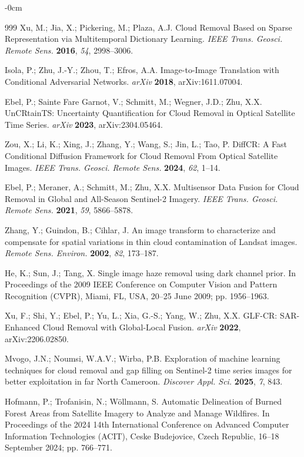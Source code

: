 \documentclass[remotesensing,article,submit,pdftex,moreauthors]{Definitions/mdpi}
\begin{document}
\begin{adjustwidth}{-\extralength}{0cm}
\begin{thebibliography}{999}
Xu, M.; Jia, X.; Pickering, M.; Plaza, A.J. Cloud Removal Based on Sparse Representation via Multitemporal Dictionary Learning. {\em IEEE Trans. Geosci. Remote Sens.} {\bf 2016}, {\em 54}, 2998--3006.

Isola, P.; Zhu, J.-Y.; Zhou, T.; Efros, A.A. Image-to-Image Translation with Conditional Adversarial Networks. {\em arXiv} {\bf 2018}, arXiv:1611.07004.

Ebel, P.; Sainte Fare Garnot, V.; Schmitt, M.; Wegner, J.D.; Zhu, X.X. UnCRtainTS: Uncertainty Quantification for Cloud Removal in Optical Satellite Time Series. {\em arXiv} {\bf 2023}, arXiv:2304.05464.

Zou, X.; Li, K.; Xing, J.; Zhang, Y.; Wang, S.; Jin, L.; Tao, P. DiffCR: A Fast Conditional Diffusion Framework for Cloud Removal From Optical Satellite Images. {\em IEEE Trans. Geosci. Remote Sens.} {\bf 2024}, {\em 62}, 1--14.

Ebel, P.; Meraner, A.; Schmitt, M.; Zhu, X.X. Multisensor Data Fusion for Cloud Removal in Global and All-Season Sentinel-2 Imagery. {\em IEEE Trans. Geosci. Remote Sens.} {\bf 2021}, {\em 59}, 5866--5878.

Zhang, Y.; Guindon, B.; Cihlar, J. An image transform to characterize and compensate for spatial variations in thin cloud contamination of Landsat images. {\em Remote Sens. Environ.} {\bf 2002}, {\em 82}, 173--187.

He, K.; Sun, J.; Tang, X. Single image haze removal using dark channel prior. In Proceedings of the 2009 IEEE Conference on Computer Vision and Pattern Recognition (CVPR), Miami, FL, USA, 20–25 June 2009; pp. 1956--1963.

Xu, F.; Shi, Y.; Ebel, P.; Yu, L.; Xia, G.-S.; Yang, W.; Zhu, X.X. GLF-CR: SAR-Enhanced Cloud Removal with Global-Local Fusion. {\em arXiv} {\bf 2022}, arXiv:2206.02850.

Mvogo, J.N.; Noumsi, W.A.V.; Wirba, P.B. Exploration of machine learning techniques for cloud removal and gap filling on Sentinel-2 time series images for better exploitation in far North Cameroon. {\em Discover Appl. Sci.} {\bf 2025}, {\em 7}, 843.

Hofmann, P.; Trofanisin, N.; Wöllmann, S. Automatic Delineation of Burned Forest Areas from Satellite Imagery to Analyze and Manage Wildfires. In Proceedings of the 2024 14th International Conference on Advanced Computer Information Technologies (ACIT), Ceske Budejovice, Czech Republic, 16–18 September 2024; pp. 766--771.


\end{thebibliography}
\end{adjustwidth}
\end{document}
